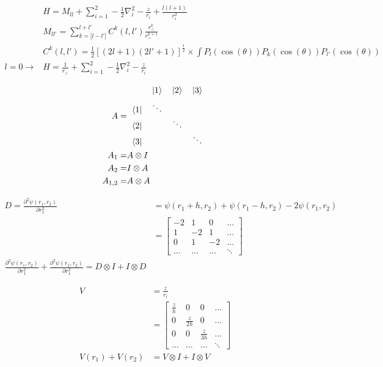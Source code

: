 \documentclass{article}
\begin{document}
\begin{align*}
  &H=M_{ll}+\sum_{i=1}^2-\frac{1}{2}\nabla^2_i-\frac{z}{r_i}+\frac{l(l+1)}{r_i^2}\\
  &M_{ll'}=\sum_{k=|l-l'|}^{l+l'}C^k(l,l')\frac{r^k_<}{r^{k+1}_>}\\
  &C^k(l,l')=\frac{1}{2}[(2l+1)(2l'+1)]^{\frac{1}{2}}\times\int P_l(\cos(\theta))P_k(\cos(\theta))P_{l'}(\cos(\theta))\\
  l=0\rightarrow &H=\frac{1}{r_>}+\sum_{i=1}^2-\frac{1}{2}\nabla^2_i-\frac{z}{r_i}\\
\end{align*}
\begin{align*}
  A=&\begin{tabular}{c @{\hspace{2\tabcolsep}} *{3}{c}}
  &
  \itshape $|1\rangle$ &
  \itshape $|2\rangle$ &
  \itshape $|3\rangle$ 
\\[1ex]
\bfseries $\langle 1 |$& $\ddots$ & & \\
\bfseries $\langle 2 |$& & $\ddots$ & \\
\bfseries $\langle 3 |$& & & $\ddots$ 
\end{tabular}\\
  A_1=&A\otimes I\\
  A_2=&I\otimes A\\
  A_{1,2}=&A\otimes A
\end{align*}

\begin{align*}
  D=\frac{\partial^2\psi(r_1,r_2)}{\partial r_1^2}&=\psi(r_1+h,r_2)+\psi(r_1-h,r_2)-2\psi(r_1,r_2)\\
  &=\begin{bmatrix}
    -2 & 1 & 0 & \dots\\
    1 & -2 & 1 & \dots\\
    0 & 1 & -2 & \dots\\
    \dots & \dots & \dots & \ddots
  \end{bmatrix}\\
  \frac{\partial^2\psi(r_1,r_2)}{\partial r_1^2} + \frac{\partial^2\psi(r_1,r_2)}{\partial r_1^2}=D\otimes I + I\otimes D
\end{align*}

\begin{align*}
  V&=\frac{z}{r_i}\\
  &=\begin{bmatrix}
    \frac{z}{h} & 0 & 0 & \dots\\
    0 & \frac{z}{2h} & 0 & \dots\\
    0 & 0 & \frac{z}{3h} & \dots\\
    \dots & \dots & \dots & \ddots
  \end{bmatrix}\\
  V(r_1)+V(r_2)&=V\otimes I + I\otimes V
\end{align*}
\end{document}
